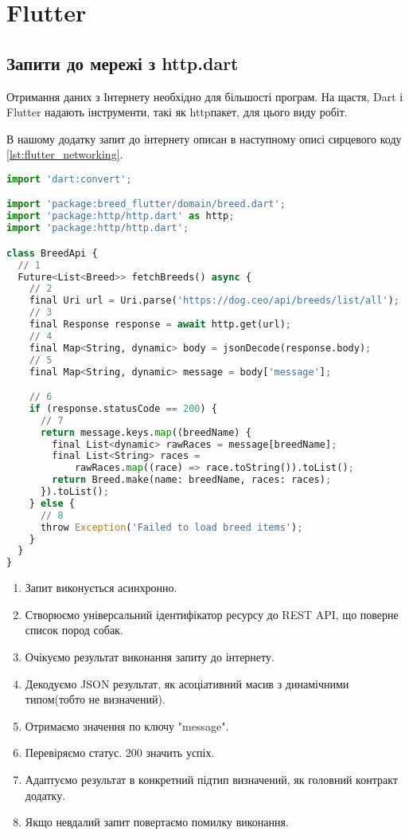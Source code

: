 \chapter{Flutter}
\label{ch3}




\section{Запити до мережі з http.dart}
\label{section.3.3}
Отримання даних з Інтернету необхідно для більшості програм. На щастя, Dart і Flutter надають інструменти, такі як httpпакет, для цього виду робіт.

В нашому додатку запит до інтернету описан в наступному описі сирцевого коду \ref{lst:flutter_networking}.

\begin{lstlisting}[style=light, language=Python,label={lst:flutter_networking},caption=Flutter Networking]
import 'dart:convert';

import 'package:breed_flutter/domain/breed.dart';
import 'package:http/http.dart' as http;
import 'package:http/http.dart';

class BreedApi {
  // 1
  Future<List<Breed>> fetchBreeds() async {
    // 2
    final Uri url = Uri.parse('https://dog.ceo/api/breeds/list/all');
    // 3
    final Response response = await http.get(url);
    // 4
    final Map<String, dynamic> body = jsonDecode(response.body);
    // 5
    final Map<String, dynamic> message = body['message'];

    // 6
    if (response.statusCode == 200) {
      // 7
      return message.keys.map((breedName) {
        final List<dynamic> rawRaces = message[breedName];
        final List<String> races =
            rawRaces.map((race) => race.toString()).toList();
        return Breed.make(name: breedName, races: races);
      }).toList();
    } else {
      // 8
      throw Exception('Failed to load breed items');
    }
  }
}
\end{lstlisting}

\begin{enumerate}
    \item Запит виконується асинхронно.
    \item Створюємо універсальний ідентифікатор ресурсу до REST API, що поверне список пород собак.
    \item Очікуємо результат виконання запиту до інтернету.
    \item Декодуємо JSON результат, як асоціативний масив з динамічними типом(тобто не визначений).
    \item Отримаємо значення по ключу "message".
    \item Перевіряємо статус. 200 значить успіх.
    \item Адаптуємо результат в конкретний підтип визначений, як головний контракт додатку.
    \item Якщо невдалий запит повертаємо помилку виконання.
\end{enumerate}

